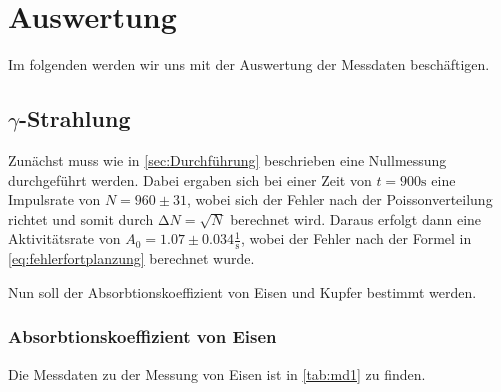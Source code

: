 \section{Auswertung}
\label{sec:Auswertung}

Im folgenden werden wir uns mit der Auswertung der Messdaten beschäftigen.

\subsection[Gamma-Strahlung]{$\gamma$-Strahlung}

Zunächst muss wie in \ref{sec:Durchführung} beschrieben eine Nullmessung durchgeführt werden.
Dabei ergaben sich bei einer Zeit von $t = 900 \unit\second$ eine Impulsrate von $N = 960 \pm 31$,
wobei sich der Fehler nach der Poissonverteilung richtet und somit durch $\increment N = \sqrt{N}$ berechnet wird.
Daraus erfolgt dann eine Aktivitätsrate von $A_0 = 1.07 \pm 0.034 \frac{1}{\unit\second}$, wobei der Fehler nach
der Formel in \autoref{eq:fehlerfortplanzung} berechnet wurde.

Nun soll der Absorbtionskoeffizient von Eisen und Kupfer bestimmt werden.

\subsubsection[Absorbtionskoeffizient von Eisen]{Absorbtionskoeffizient von Eisen}

Die Messdaten zu der Messung von Eisen ist in \autoref{tab:md1} zu finden.